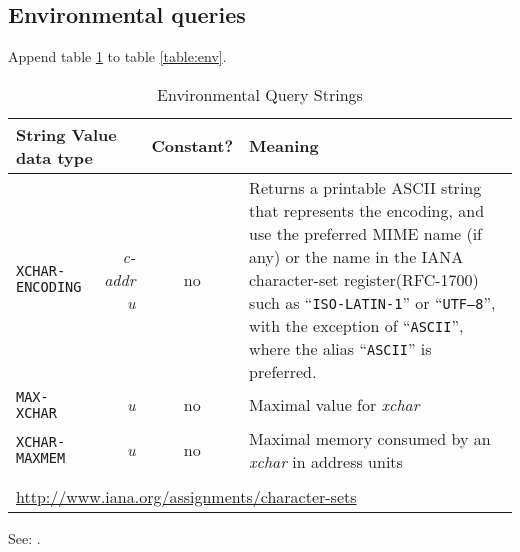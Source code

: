 \subsection{Environmental queries} %

Append table \ref{xchar:env} to table \ref{table:env}.

\begin{table}[ht]
	\begin{center}
		\caption{Environmental Query Strings}
		\label{xchar:env}
		\begin{tabular}{p{9em}rcp{}}
			\hline\hline
			\multicolumn{2}{l}{String \hfill Value data type} & Constant? & Meaning \\
			\hline
			\texttt{XCHAR-ENCODING}		& \emph{c-addr u} & no &
				Returns a printable ASCII string that represents the encoding,
				and use the preferred MIME name (if any) or the name in the
				IANA character-set register\footnotemark[1] (RFC-1700) such
				as ``\texttt{ISO-LATIN-1}'' or ``\texttt{UTF--8}'',
				with the exception of ``\texttt{ASCII}'', where the alias
				``\texttt{ASCII}'' is preferred. \\

			\texttt{MAX-XCHAR}			& \emph{u} & no &
				Maximal value for \emph{xchar} \\
			\texttt{XCHAR-MAXMEM}		& \emph{u} & no &
				Maximal memory consumed by an \emph{xchar} in address units \\
			\hline\hline \\[-1ex]
			\multicolumn{4}{l}{\footnotemark[1]
				\url{http://www.iana.org/assignments/character-sets}} \\
		\end{tabular}
	\end{center}
\end{table}

See: .



